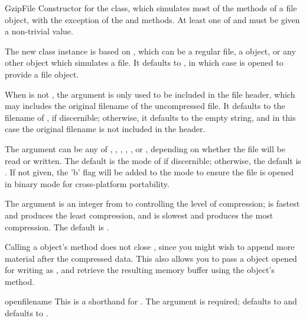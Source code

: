 \begin{classdesc}{GzipFile}{}
Constructor for the  class, which simulates most of
the methods of a file object, with the exception of the 
and  methods.  At least one of
 and  must be given a non-trivial value.

The new class instance is based on , which can be a
regular file, a  object, or any other object which
simulates a file.  It defaults to , in which case
 is opened to provide a file object.

When  is not , the  argument is
only used to be included in the  file header, which may
includes the original filename of the uncompressed file.  It defaults
to the filename of , if discernible; otherwise, it
defaults to the empty string, and in this case the original filename
is not included in the header.

The  argument can be any of , ,
, , , or , depending on
whether the file will be read or written.  The default is the mode of
 if discernible; otherwise, the default is .
If not given, the 'b' flag will be added to the mode to ensure the
file is opened in binary mode for cross-platform portability.

The  argument is an integer from  to
 controlling the level of compression;  is fastest and
produces the least compression, and  is slowest and produces
the most compression.  The default is .

Calling a  object's  method does not
close , since you might wish to append more material
after the compressed data.  This also allows you to pass a
 object opened for writing as , and
retrieve the resulting memory buffer using the 
object's  method.
\end{classdesc}

\begin{funcdesc}{open}{filename}
This is a shorthand for 
 .  The 
argument is required;  defaults to  and
 defaults to .
\end{funcdesc}

\begin{seealso}
\end{seealso}
